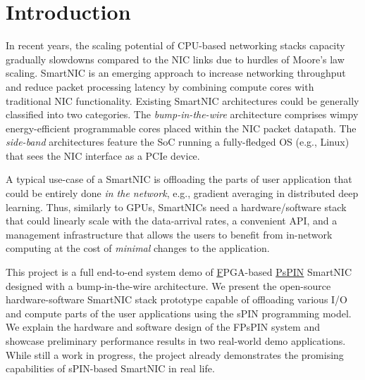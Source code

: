 \newcommand{\package}{\emph}

\chapter{Introduction}

In recent years, the scaling potential of CPU-based networking stacks capacity gradually slowdowns compared to the NIC links due to hurdles of Moore's law scaling. SmartNIC is an emerging approach to increase networking throughput and reduce packet processing latency by combining compute cores with traditional NIC functionality. Existing SmartNIC architectures could be generally classified into two categories. The \textit{bump-in-the-wire} architecture comprises wimpy energy-efficient programmable cores placed within the NIC packet datapath. The \textit{side-band} architectures feature the SoC running a fully-fledged OS (e.g., Linux) that sees the NIC interface as a PCIe device.

A typical use-case of a SmartNIC is offloading the parts of user application that could be entirely done \textit{in the network}, e.g., gradient averaging in distributed deep learning. Thus, similarly to GPUs, SmartNICs need a hardware/software stack that could linearly scale with the data-arrival rates, a convenient API, and a management infrastructure that allows the users to benefit from in-network computing at the cost of \textit{minimal} changes to the application.

This project is a full end-to-end system demo of \underline{F}PGA-based \underline{PsPIN} SmartNIC~\cite{di2021risc} designed with a bump-in-the-wire architecture. We present the open-source hardware-software SmartNIC stack prototype capable of offloading various I/O and compute parts of the user applications using the sPIN programming model. We explain the hardware and software design of the FPsPIN system and showcase preliminary performance results in two real-world demo applications. While still a work in progress, the project already demonstrates the promising capabilities of sPIN-based SmartNIC in real life.

